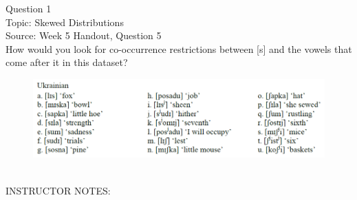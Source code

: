 \documentclass[12pt]{article}
\begin{document}
\begin{center}
\textbf{{\color{violet}{\HUGE 20201013 Tuesday\\}}}

\textbf{{\color{violet}{\HUGE ALL EXAMS (with notes)\\}}}

\end{center}
\newpage

\begin{center}
\textbf{{\color{blue}{\HUGE START OF EXAM\\}}}

\textbf{{\color{blue}{\HUGE Student ID: empty\\}}}

\textbf{{\color{blue}{\HUGE 9:00\\}}}

\end{center}
\newpage

\begin{center}
\textbf{{\color{blue}{\HUGE START OF EXAM\\}}}

\textbf{{\color{blue}{\HUGE Student ID: 48772\\}}}

\textbf{{\color{blue}{\HUGE 9:10\\}}}

\end{center}
\newpage

{\large Question 1}\\

Topic: Skewed Distributions\\
Source: Week 5 Handout, Question 5\\

How would you look for co-occurrence restrictions between [s] and the vowels that come after it in this dataset?\\

\begin{figure}[H]
\includegraphics{../images/ukrainian.png}
\end{figure}

~\\
INSTRUCTOR NOTES: 
\end{document}
